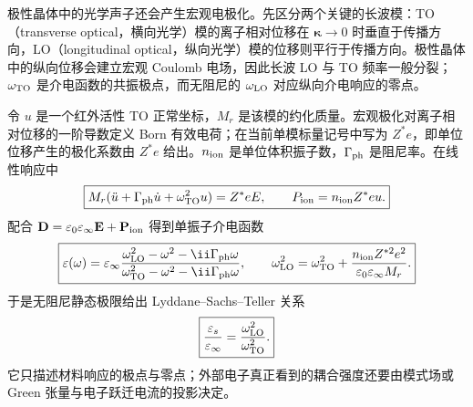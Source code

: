 极性晶体中的光学声子还会产生宏观电极化。先区分两个关键的长波模：TO（transverse optical，横向光学）模的离子相对位移在 $\boldsymbol\kappa\to0$ 时垂直于传播方向，LO（longitudinal optical，纵向光学）模的位移则平行于传播方向。极性晶体中的纵向位移会建立宏观 Coulomb 电场，因此长波 LO 与 TO 频率一般分裂；$\omega_{\rm TO}$ 是介电函数的共振极点，而无阻尼的 $\omega_{\rm LO}$ 对应纵向介电响应的零点。

令 $u$ 是一个红外活性 TO 正常坐标，$M_r$ 是该模的约化质量。宏观极化对离子相对位移的一阶导数定义 Born 有效电荷；在当前单模标量记号中写为 $Z^*e$，即单位位移产生的极化系数由 $Z^*e$ 给出。$n_{\rm ion}$ 是单位体积振子数，$\Gamma_{\rm ph}$ 是阻尼率。在线性响应中
\begin{equation}
\boxed{
M_r(\ddot u+\Gamma_{\rm ph}\dot u+\omega_{\rm TO}^2u)=Z^*eE,
\qquad
P_{\rm ion}=n_{\rm ion}Z^*eu.}
\label{eq:polar-optical-oscillator-eom-dp76}
\end{equation}
配合 $\mathbf D=\varepsilon_0\varepsilon_\infty\mathbf E+\mathbf P_{\rm ion}$ 得到单振子介电函数
\begin{equation}
\boxed{
\varepsilon(\omega)
=\varepsilon_\infty
\frac{\omega_{\rm LO}^2-\omega^2-\ii\Gamma_{\rm ph}\omega}
{\omega_{\rm TO}^2-\omega^2-\ii\Gamma_{\rm ph}\omega},
\qquad
\omega_{\rm LO}^2
=\omega_{\rm TO}^2+
\frac{n_{\rm ion}Z^{*2}e^2}{\varepsilon_0\varepsilon_\infty M_r}.}
\label{eq:polar_optical_dielectric_response}
\end{equation}
于是无阻尼静态极限给出 Lyddane--Sachs--Teller 关系
\begin{equation}
\boxed{
\frac{\varepsilon_s}{\varepsilon_\infty}
=\frac{\omega_{\rm LO}^2}{\omega_{\rm TO}^2}.}
\label{eq:lattice_lst_relation}
\end{equation}
它只描述材料响应的极点与零点；外部电子真正看到的耦合强度还要由模式场或 Green 张量与电子跃迁电流的投影决定。

